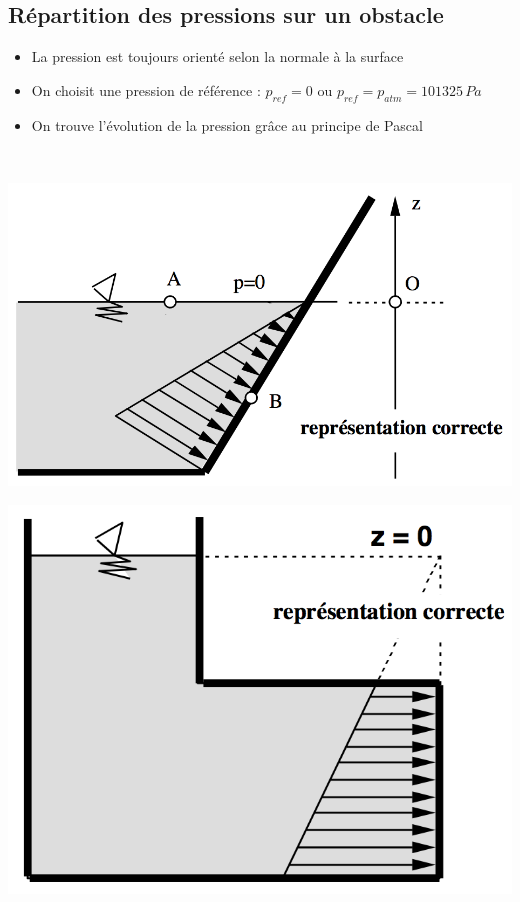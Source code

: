 \subsection*{Répartition des pressions sur un obstacle}
\begin{itemize}
\item La pression est toujours orienté selon la normale à la surface
\item On choisit une pression de référence : $p_{ref} = 0$ ou $p_{ref} = p_{atm} = 101325 \, Pa$
\item On trouve l'évolution de la pression grâce au principe de Pascal
\end{itemize}
\ \\
\begin{minipage}{0.55 \textwidth}
\begin{flushleft}
	\includegraphics[scale=0.5]{tp4-1}
\end{flushleft}
\end{minipage}
\begin{minipage}{0.5 \textwidth}
\begin{flushleft}
	\includegraphics[scale=0.5]{tp4-2}
\end{flushleft}
\end{minipage}